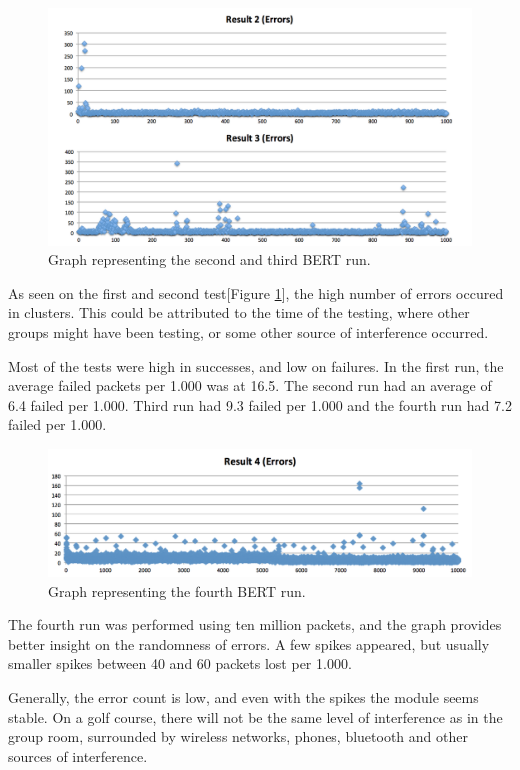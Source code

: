 \begin{figure}[h!]
\hspace*{-2cm}
\includegraphics[width=1.3\textwidth]{chapters/test/figures/res5.png}
\caption{Graph representing the second and third BERT run.}
\label{fig:bert2}
\end{figure}

As seen on the first and second test[Figure \ref{fig:bert2}], the high number of errors occured in clusters. This could be attributed to the time of the testing, where other groups might have been testing, or some other source of interference occurred.

Most of the tests were high in successes, and low on failures. In the first run, the average failed packets per 1.000 was at 16.5. The second run had an average of 6.4 failed per 1.000. Third run had 9.3 failed per 1.000 and the fourth run had 7.2 failed per 1.000.


\begin{figure}[h!]
\hspace*{-2cm}
\includegraphics[width=1.3\textwidth]{chapters/test/figures/res4.png}
\caption{Graph representing the fourth BERT run.}
\label{fig:bert3}
\end{figure}

The fourth run was performed using ten million packets, and the graph provides better insight on the randomness of errors. A few spikes appeared, but usually smaller spikes between 40 and 60 packets lost per 1.000.

Generally, the error count is low, and even with the spikes the module seems stable. On a golf course, there will not be the same level of interference as in the group room, surrounded by wireless networks, phones, bluetooth and other sources of interference.

